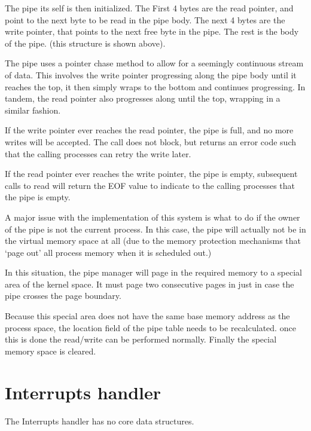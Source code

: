 \documentclass[a4paper]{report}
\begin{document}
The pipe its self is then initialized. The First 4 bytes are the read pointer, and point to the next byte to be read in the pipe body. The next 4 bytes are the write pointer, that points to the next free byte in the pipe. The rest is the body of the pipe. (this structure is shown above). 

The pipe uses a pointer chase method to allow for a seemingly continuous stream of data. This involves the write pointer progressing along the pipe body until it reaches the top, it then simply wraps to the bottom and continues progressing. In tandem, the read pointer also progresses along until the top, wrapping in a similar fashion.

If the write pointer ever reaches the read pointer, the pipe is full, and no more writes will be accepted. The call does not block, but returns an error code such that the calling processes can retry the write later.

If the read pointer ever reaches the write pointer, the pipe is empty, subsequent calls to read will return the EOF value to indicate to the calling processes that the pipe is empty.

A major issue with the implementation of this system is what to do if the owner of the pipe is not the current process. In this case, the pipe will actually not be in the virtual memory space at all (due to the memory protection mechanisms that `page out' all process memory when it is scheduled out.)

In this situation, the pipe manager will page in the required memory to a special area of the kernel space. It must page two consecutive pages in just in case the pipe crosses the page boundary.

Because this special area does not have the same base memory address as the process space, the location field of the pipe table needs to be recalculated. once this is done the read/write can be performed normally. Finally the special memory space is cleared.











\section{Interrupts handler}

The Interrupts handler has no core data structures.
\end{document}
